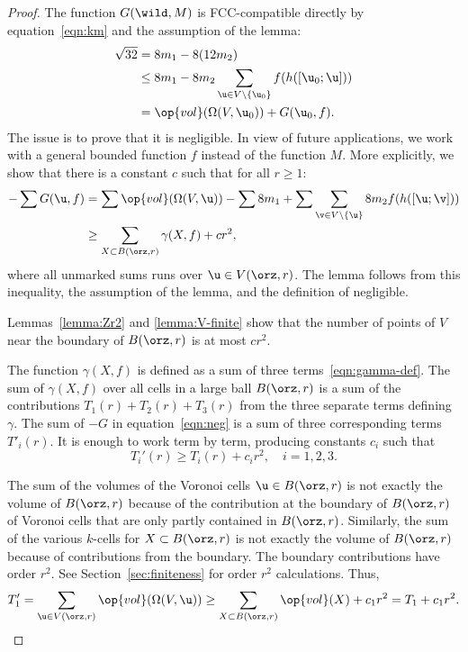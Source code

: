 \begin{proof} 
%
The function $G(\wild,M)$ is FCC-compatible directly
by equation~\eqref{eqn:km}
and the assumption of the lemma:
%
%
\begin{align*} 
\sqrt{32} &= 8 m_1 - 8 (12 m_2)\\
&\le 8 m_1 - 8 m_2 \sum_{\u\in V\setminus \{\u_0\} } f(h([\u_0;\u]))\\
&= \op{vol}(\Omega(V, \u_0)) + G( \u_0,f).
\end{align*}
The issue is to prove that it is negligible.  In view of future applications, 
we work with a general bounded function $f$ instead
of the function $M$.   More explicitly, we show that there is a
constant $c$ such that for all $r\ge 1$:%
\begin{align}\label{eqn:neg} 
-\sum G( \u,f) &= 
\sum \op{vol}(\Omega(V, \u)) 
-\sum 8m_1 + 
\sum \sum_{\v\in V\setminus\{\u\} } 8 m_2 f(h([\u;\v]))\notag \\
&\ge \sum_{X\subset B(\orz,r)} \gamma(X,f)  + c r^2,
\end{align}
where all unmarked sums runs over $ \u\in  V(\orz,r)$.  
The lemma follows from this inequality, the assumption of the lemma,
 and the definition of negligible.

Lemmas~\ref{lemma:Zr2} and \ref{lemma:V-finite} show that the number
of points of $ V$ near the boundary of $B(\orz,r)$ is at most $c r^2$.


The function $\gamma(X,f)$ is defined as a sum of three
terms~\eqref{eqn:gamma-def}.  The sum of $\gamma(X,f)$
over all cells in a large ball
$B(\orz,r)$ is a sum of the contributions $T_1(r) + T_2(r) + T_3(r)$ from
the three separate terms defining $\gamma$.  
The sum of $-G$ in  equation~\eqref{eqn:neg} is a sum of three
corresponding terms $T'_i(r)$.  It is enough to work term by term, producing
constants $c_i$ such that
\[  
T_i'(r) \ge T_i(r) + c_i r^2,\quad i=1,2,3.
\] 

The sum of the volumes of the Voronoi cells $ \u\in B(\orz,r)$ is not
exactly the volume of $B(\orz,r)$ because of the contribution at the
boundary of $B(\orz,r)$ of Voronoi cells that are only partly contained
in $B(\orz,r)$.  Similarly, the sum of the various $k$-cells for
$X\subset B(\orz,r)$ is not exactly the volume of $B(\orz,r)$ because of
contributions from the boundary. The boundary contributions have order
$r^2$.  See Section~\ref{sec:finiteness} for order $r^2$ calculations. 
Thus,
\[  
T_1'= \sum_{ \u\in  V(\orz,r)} \op{vol}(\Omega(V, \u)) 
\ge \sum_{X\subset B(\orz,r)} \op{vol}(X) + c_1 r^2 = T_1 + c_1 r^2.
\] 



\end{proof}
